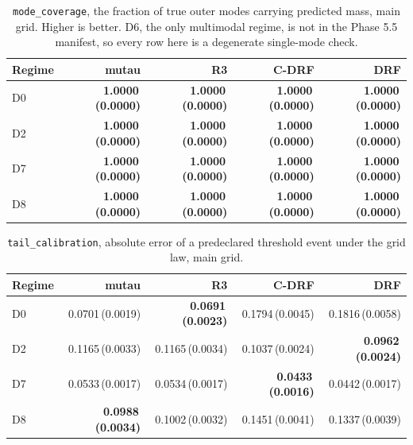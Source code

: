 \begin{table}[htbp]
\centering
\caption{\texttt{mode\_coverage}, the fraction of true outer modes carrying predicted mass, main grid. Higher is better. D6, the only multimodal regime, is not in the Phase 5.5 manifest, so every row here is a degenerate single-mode check.}
\label{tab:p55-mode}
\scriptsize
\setlength{\tabcolsep}{3.2pt}
\begin{tabular}{@{}lrrrr@{}}
\toprule
Regime & mutau & R3 & C-DRF & DRF \\
\midrule
D0 & \textbf{1.0000\,(0.0000)} & \textbf{1.0000\,(0.0000)} & \textbf{1.0000\,(0.0000)} & \textbf{1.0000\,(0.0000)} \\
D2 & \textbf{1.0000\,(0.0000)} & \textbf{1.0000\,(0.0000)} & \textbf{1.0000\,(0.0000)} & \textbf{1.0000\,(0.0000)} \\
D7 & \textbf{1.0000\,(0.0000)} & \textbf{1.0000\,(0.0000)} & \textbf{1.0000\,(0.0000)} & \textbf{1.0000\,(0.0000)} \\
D8 & \textbf{1.0000\,(0.0000)} & \textbf{1.0000\,(0.0000)} & \textbf{1.0000\,(0.0000)} & \textbf{1.0000\,(0.0000)} \\
\bottomrule
\end{tabular}
\end{table}

\begin{table}[htbp]
\centering
\caption{\texttt{tail\_calibration}, absolute error of a predeclared threshold event under the grid law, main grid.}
\label{tab:p55-tail}
\scriptsize
\setlength{\tabcolsep}{3.2pt}
\begin{tabular}{@{}lrrrr@{}}
\toprule
Regime & mutau & R3 & C-DRF & DRF \\
\midrule
D0 & 0.0701\,(0.0019) & \textbf{0.0691\,(0.0023)} & 0.1794\,(0.0045) & 0.1816\,(0.0058) \\
D2 & 0.1165\,(0.0033) & 0.1165\,(0.0034) & 0.1037\,(0.0024) & \textbf{0.0962\,(0.0024)} \\
D7 & 0.0533\,(0.0017) & 0.0534\,(0.0017) & \textbf{0.0433\,(0.0016)} & 0.0442\,(0.0017) \\
D8 & \textbf{0.0988\,(0.0034)} & 0.1002\,(0.0032) & 0.1451\,(0.0041) & 0.1337\,(0.0039) \\
\bottomrule
\end{tabular}
\end{table}

